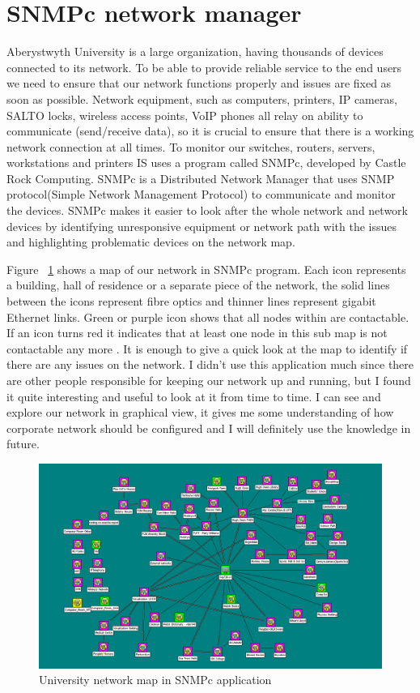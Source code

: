 \documentclass[10pt,a4paper,headinclude=true,twoside]{report}
\begin{document}
\section{SNMPc network manager}
Aberystwyth University is a large organization, having thousands of devices connected to its network. To be able to provide reliable service to the end users we need to ensure that our network functions properly and issues are fixed as soon as possible. Network equipment, such as computers, printers, IP cameras, SALTO locks, wireless access points, VoIP phones all relay on ability to communicate (send/receive data), so it is crucial to ensure that there is a working network connection at all times. To monitor our switches, routers, servers, workstations and printers IS uses a program called SNMPc, developed by Castle Rock Computing. SNMPc is a Distributed Network Manager \cite{SNMPc} that uses SNMP protocol(Simple Network Management Protocol) to communicate and monitor the devices. SNMPc makes it easier to look after the whole network and network devices by identifying unresponsive equipment or network path with the issues and highlighting problematic devices on the network map. 

Figure ~\ref{fig:SNMPc_main} shows a map of our network in SNMPc program. Each icon represents a building, hall of residence or a separate piece of the network, the solid lines between the icons represent fibre optics and thinner lines represent gigabit Ethernet links. Green or purple icon shows that all nodes within are contactable. If an icon turns red it indicates that at least one node in this sub map is not contactable any more \cite{SNPMcSharePoint}. It is enough to give a quick look at the map to identify if there are any issues on the network. I didn't use this application much since there are other people responsible for keeping our network up and running, but I found it quite interesting and useful to look at it from time to time. I can see and explore our network in graphical view, it gives me some understanding of how corporate network should be configured and I will definitely use the knowledge in future.

\begin{figure}[H]
\centering
\centerline{\includegraphics[scale=0.5]{./SNMPc_main}}
\caption{University network map in SNMPc application}
\label{fig:SNMPc_main}
\end{figure}
\end{document}
